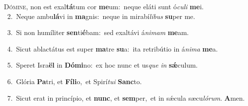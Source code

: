 \lettrine{\initial\textcolor{\initialcolor}{D}}{ómine,} non est exal\-\textbf{tá}\-tum cor \textbf{me}\-um:~\star neque eláti sunt ó\-\textit{cu}\-\textit{li} \textbf{me}\-i.\\
{\numbfont\textcolor{\numbcolor}{~2.}}~Neque ambu\-\textbf{lá}\-vi in \textbf{ma}\-gnis:~\star neque in mirabí\-\textit{li}\-\textit{bus} \textbf{su}\-per me.\par
{\numbfont\textcolor{\numbcolor}{~3.}}~Si non humíliter \textbf{sen}\-ti\-\textbf{é}\-bam:~\star sed exaltávi á\-\textit{ni}\-\textit{mam} \textbf{me}\-am.\par
{\numbfont\textcolor{\numbcolor}{~4.}}~Sicut ablactátus est super \textbf{ma}\-tre \textbf{su}\-a:~\star ita retribútio in á\-\textit{ni}\-\textit{ma} \textbf{me}\-a.\par
{\numbfont\textcolor{\numbcolor}{~5.}}~Speret Isra\textbf{ël} in \textbf{Dó}\-\textbf{mi}no:~\star ex hoc nunc et us\textit{que} \textit{in} \textbf{sǽ}\-culum.\par
{\numbfont\textcolor{\numbcolor}{~6.}}~Glória \textbf{Pa}\-tri, et \textbf{Fí}\-\textbf{li}o,~\star et Spirí\-\textit{tu}\-\textit{i} \textbf{Sanc}\-to.\par
{\numbfont\textcolor{\numbcolor}{~7.}}~Sicut erat in princípio, et \textbf{nunc}\-, et \textbf{sem}\-per,~\star et in sǽcula sæcu\-\textit{ló}\-\textit{rum}. \textbf{A}\-men.\par
